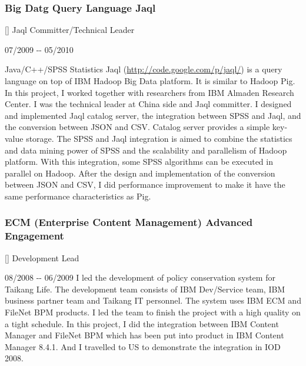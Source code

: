 \documentclass[a4paper]{article}
\newenvironment{DUlineblock}[1]{%
    \list{}{\setlength{\partopsep}{\parskip}
            \addtolength{\partopsep}{\baselineskip}
            \setlength{\topsep}{0pt}
            \setlength{\itemsep}{0.15\baselineskip}
            \setlength{\parsep}{0pt}
            \setlength{\leftmargin}{#1}}
    \raggedright
  }
  {\endlist}
\begin{document}
\begin{CJK}{UTF8}{gkai}
\subsubsection*{Big Datg Query Language Jaql}
\begin{DUlineblock}{0em}
\item[] Jaql Committer/Technical Leader
\item[] 07/2009 -{}- 05/2010
\item[] Java/C++/SPSS Statistics
\end{DUlineblock}
Jaql (\url{http://code.google.com/p/jaql/}) is a query language on top of IBM Hadoop Big Data platform.
It is similar to Hadoop Pig. In this project, I worked together with researchers
from IBM Almaden Research Center. I was the technical leader at China side and Jaql
committer. I designed and implemented Jaql catalog server, the integration between
SPSS and Jaql, and the conversion between JSON and CSV. Catalog server provides a
simple key-value storage. The SPSS and Jaql integration is aimed to combine the
statistics and data mining power of SPSS and the scalability and parallelism of
Hadoop platform. With this integration, some SPSS algorithms can be executed in
parallel on Hadoop. After the design and implementation of the conversion between
JSON and CSV, I did performance improvement to make it have the same performance
characteristics as Pig.

\subsubsection*{ECM (Enterprise Content Management) Advanced Engagement}
\begin{DUlineblock}{0em}
\item[] Development Lead
\item[] 08/2008 -{}- 06/2009
\end{DUlineblock}
I led the development of policy conservation system for Taikang Life. The
development team consists of IBM Dev/Service team, IBM business partner team
and Taikang IT personnel. The system uses IBM ECM and FileNet BPM products. I
led the team to finish the project with a high quality on a tight schedule. In
this project, I did the integration between IBM Content Manager and FileNet BPM
which has been put into product in IBM Content Manager 8.4.1. And I travelled
to US to demonstrate the integration in IOD 2008.


\end{CJK}
\end{document}
